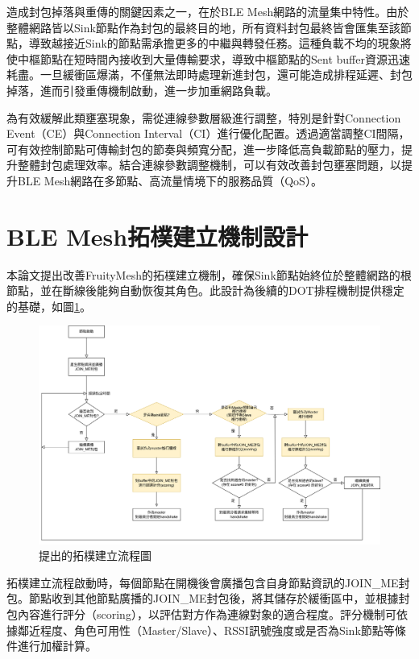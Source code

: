 \begin{ZhChapter}
造成封包掉落與重傳的關鍵因素之一，在於BLE Mesh網路的流量集中特性。由於整體網路皆以Sink節點作為封包的最終目的地，所有資料封包最終皆會匯集至該節點，導致越接近Sink的節點需承擔更多的中繼與轉發任務。這種負載不均的現象將使中樞節點在短時間內接收到大量傳輸要求，導致中樞節點的Sent buffer資源迅速耗盡。一旦緩衝區爆滿，不僅無法即時處理新進封包，還可能造成排程延遲、封包掉落，進而引發重傳機制啟動，進一步加重網路負載。

為有效緩解此類壅塞現象，需從連線參數層級進行調整，特別是針對Connection Event（CE）與Connection Interval（CI）進行優化配置。透過適當調整CI間隔，可有效控制節點可傳輸封包的節奏與頻寬分配，進一步降低高負載節點的壓力，提升整體封包處理效率。結合連線參數調整機制，可以有效改善封包壅塞問題，以提升BLE Mesh網路在多節點、高流量情境下的服務品質（QoS）。

\section{BLE Mesh拓樸建立機制設計}

本論文提出改善FruityMesh的拓樸建立機制，確保Sink節點始終位於整體網路的根節點，並在斷線後能夠自動恢復其角色。此設計為後續的DOT排程機制提供穩定的基礎，如圖\ref{fig: 提出的拓樸建立流程圖}。

\begin{figure}[htbp]
    \centering
    \includegraphics[width = 1\textwidth]{image/build-up_pro2.png}
    \caption{提出的拓樸建立流程圖}
    \label{fig: 提出的拓樸建立流程圖}
\end{figure}

拓樸建立流程啟動時，每個節點在開機後會廣播包含自身節點資訊的JOIN\_ME封包。節點收到其他節點廣播的JOIN\_ME封包後，將其儲存於緩衝區中，並根據封包內容進行評分（scoring），以評估對方作為連線對象的適合程度。評分機制可依據鄰近程度、角色可用性（Master/Slave）、RSSI訊號強度或是否為Sink節點等條件進行加權計算。


\end{ZhChapter}
